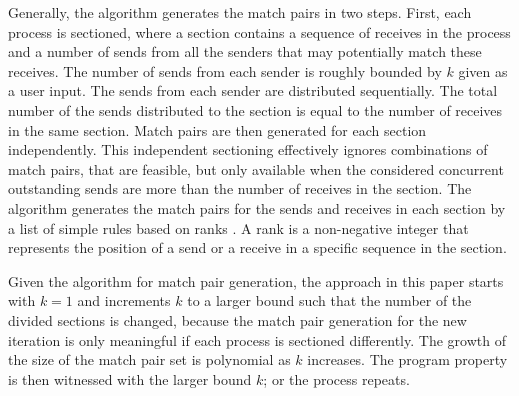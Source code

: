 Generally, the algorithm generates the match pairs in two steps. 
First, each process is sectioned, where a section contains a sequence of receives in the process and a number of sends from all the senders that may potentially match these receives. The number of sends from each sender is roughly bounded by  $k$ given as a user input. 
The sends from each sender are distributed sequentially. 
The total number of the sends distributed to the section is equal to the number of receives in the same section. 
Match pairs are then generated for each section independently. This independent sectioning effectively ignores combinations of match pairs, that are feasible, but only available when the considered concurrent outstanding sends are more than the number of receives in the section. 
The algorithm generates the match pairs for the sends and receives in each section by a list of simple rules based on ranks \cite{DBLP:conf/kbse/HuangMM13}. A rank is a non-negative integer that represents the position of a send or a receive in a specific sequence in the section.

Given the algorithm for match pair generation, the approach in this paper starts with $k=1$ and increments $k$ to a larger bound such that the number of the divided sections is changed, because the match pair generation for the new iteration is only meaningful if each process is sectioned differently. The growth of the size of the match pair set is polynomial as $k$ increases. The program property is then witnessed with the larger bound $k$; or the process repeats.





